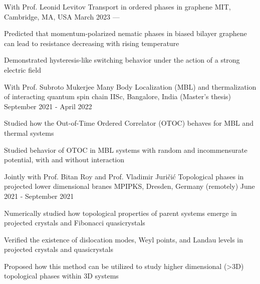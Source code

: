 

\begin{cventries}

\cventry
{With Prof. Leonid Levitov} %
{Transport in ordered phases in graphene} %
{MIT, Cambridge, MA, USA} %
{March 2023 --- } %
{
	\begin{cvitems} %
		\item{Predicted that momentum-polarized nematic phases in biased bilayer graphene can lead to resistance decreasing with rising temperature}
		\item{Demonstrated hysteresis-like switching behavior under the action of a strong electric field}
	\end{cvitems}
}

\cventry
{With Prof. Subroto Mukerjee} %
{Many Body Localization (MBL) and thermalization of interacting quantum spin chain} %
{IISc, Bangalore, India \space \space\space\space\space\space\space\space\space\space\space\space\space(Master's thesis)} %
{September 2021 - April 2022} %
	{
		\begin{cvitems} %
			\item{Studied how the Out-of-Time Ordered Correlator (OTOC) behaves for MBL and thermal systems}
			\item{Studied behavior of OTOC in MBL systems with random and incommensurate potential, with and without interaction}
		\end{cvitems}
	}


\cventry
{Jointly with Prof. Bitan Roy and Prof. Vladimir Juri\v{c}i\'c} %
{Topological phases in projected lower dimensional branes} %
{MPIPKS, Dresden, Germany (remotely)} %
{June 2021 - September 2021} %
{
	\begin{cvitems} %
		\item {Numerically studied how topological properties of parent systems emerge in projected crystals and Fibonacci quasicrystals}
		\item {Verified the existence of dislocation modes, Weyl points, and Landau levels in projected crystals and quasicrystals}
		\item {Proposed how this method can be utilized to study higher dimensional (>3D) topological phases within 3D systems}
	\end{cvitems}
}


\end{cventries}
